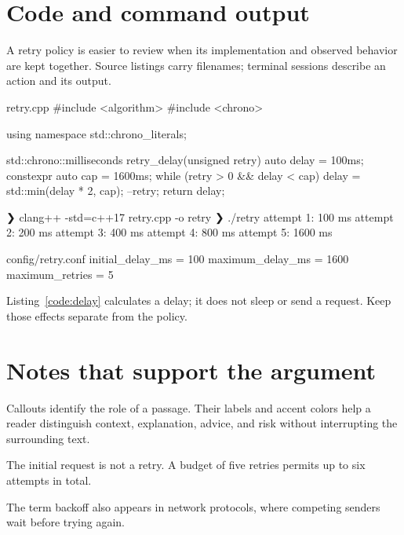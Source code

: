 \documentclass[10pt]{article}
\begin{document}
\section*{Code and command output}
A retry policy is easier to review when its implementation and observed behavior
are kept together. Source listings carry filenames; terminal sessions describe
an action and its output.

\begin{cpp}[label=code:delay]{retry.cpp}
#include <algorithm>
#include <chrono>

using namespace std::chrono_literals;

std::chrono::milliseconds retry_delay(unsigned retry) {
    auto delay = 100ms;
    constexpr auto cap = 1600ms;
    while (retry > 0 && delay < cap) {
        delay = std::min(delay * 2, cap);
        --retry;
    }
    return delay;
}
\end{cpp}

\begin{terminal}[title={Build and inspect}]
❯ clang++ -std=c++17 retry.cpp -o retry
❯ ./retry
attempt 1: 100 ms
attempt 2: 200 ms
attempt 3: 400 ms
attempt 4: 800 ms
attempt 5: 1600 ms
\end{terminal}

\begin{codeblock}{config/retry.conf}
initial_delay_ms = 100
maximum_delay_ms = 1600
maximum_retries = 5
\end{codeblock}

\begin{note}
Listing~\ref{code:delay} calculates a delay; it does not sleep or send a request.
Keep those effects separate from the policy.
\end{note}

\newpage
\section*{Notes that support the argument}
Callouts identify the role of a passage. Their labels and accent colors help a
reader distinguish context, explanation, advice, and risk without interrupting
the surrounding text.

\begin{note}
The initial request is not a retry. A budget of five retries permits up to six
attempts in total.
\end{note}

\begin{aside}
The term backoff also appears in network protocols, where competing senders
wait before trying again.
\end{aside}
\end{document}
